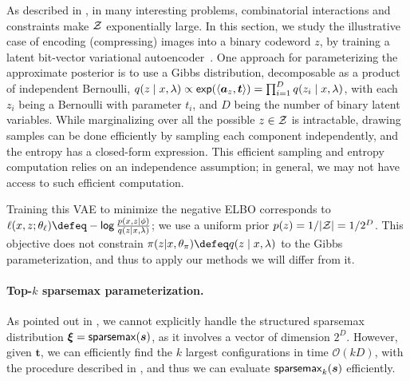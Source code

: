 As described in , in many interesting problems,
combinatorial interactions and constraints make $\mathcal{Z}$ exponentially
large. In this section, we study the illustrative case of encoding
(compressing) images into a binary codeword $z$, by training a latent
bit-vector variational autoencoder~\citep{GumbelSoftmax,
    mnih2014neural}. One approach for parameterizing the approximate
posterior is to use a Gibbs distribution, decomposable as a product
of independent Bernoulli, $q(z \mid x, \lambda) \propto
    \operatorname*{\mathsf{exp}}(\langle\bm{a}_z,\bm{t}\rangle) = \prod_{i=1}^D q(z_i \mid x, \lambda)$,
with each $z_i$ being a Bernoulli with parameter $t_i$, and $D$ being
the number of binary latent variables. While marginalizing over all the
possible $z \in \mathcal{Z}$ is intractable, drawing samples can be done
efficiently by sampling each component independently, and the entropy
has a closed-form expression.
This efficient sampling and entropy computation relies on an independence
assumption; in general, we may not have access to such efficient
computation.

Training this VAE to minimize the negative ELBO corresponds to
$\ell(x, z; \theta_\ell) \defeq - \log \frac{p(x, z | \phi)}{q(z | x,
        \lambda)} $; we use a uniform prior $p(z)=1/|\mathcal{Z}|=1/{2^D}$. This
objective does not constrain $\pi(z| x,\theta_\pi) \defeq q(z \mid x,
    \lambda)$ to the Gibbs parameterization, and thus to apply our
methods we will differ from it.

\paragraph*{Top-{\boldmath $k$} sparsemax parameterization.} As pointed
out in , we cannot explicitly handle the
structured sparsemax distribution $\bm{\xi} = \operatorname*{\mathsf{sparsemax}}(\bm{s})$, as it
involves a vector of dimension $2^D$. However, given $\bm{t}$, we can
efficiently find the $k$ largest configurations in time
$\mathcal{O}(kD)$, with the procedure described in
, and thus we can evaluate $\operatorname{\mathsf{sparsemax}_\text{$k$}}(\bm{s})$
efficiently.

